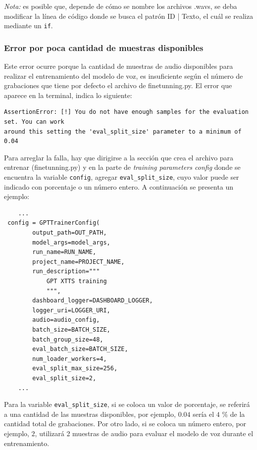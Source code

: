 \textit{Nota:} es posible que, depende de cómo se nombre los archivos .wavs, se deba modificar la línea de código donde se busca el patrón ID | Texto, el cuál se realiza mediante un \texttt{if}. 

\subsubsection{Error por poca cantidad de muestras disponibles}
Este error ocurre porque la cantidad de muestras de audio disponibles para realizar el entrenamiento del modelo de voz, es insuficiente según el número de grabaciones que tiene por defecto el archivo de finetunning.py. El error que aparece en la terminal, indica lo siguiente:

\begin{verbatim}
AssertionError: [!] You do not have enough samples for the evaluation set. You can work 
around this setting the 'eval_split_size' parameter to a minimum of 0.04
    \end{verbatim}

Para arreglar la falla, hay que dirigirse a la sección que crea el archivo para entrenar (finetunning.py) y en la parte de \textit{training parameters config} donde se encuentra la variable \texttt{config}, agregar \texttt{eval\_split\_size}, cuyo valor puede ser indicado con porcentaje o un número entero. A continuación se presenta un ejemplo:

    \begin{verbatim}
    ...
 config = GPTTrainerConfig(
        output_path=OUT_PATH,
        model_args=model_args,
        run_name=RUN_NAME,
        project_name=PROJECT_NAME,
        run_description="""
            GPT XTTS training
            """,
        dashboard_logger=DASHBOARD_LOGGER,
        logger_uri=LOGGER_URI,
        audio=audio_config,
        batch_size=BATCH_SIZE,
        batch_group_size=48,
        eval_batch_size=BATCH_SIZE,
        num_loader_workers=4,
        eval_split_max_size=256,
        eval_split_size=2,
    ...
    \end{verbatim}

Para la variable \texttt{eval\_split\_size}, si se coloca un valor de porcentaje, se referirá a una cantidad de las muestras disponibles, por ejemplo, $0.04$ sería el $4$ \% de la cantidad total de grabaciones. Por otro lado, si se coloca un número entero, por ejemplo, $2$, utilizará 2 muestras de audio para evaluar el modelo de voz durante el entrenamiento. 


    
